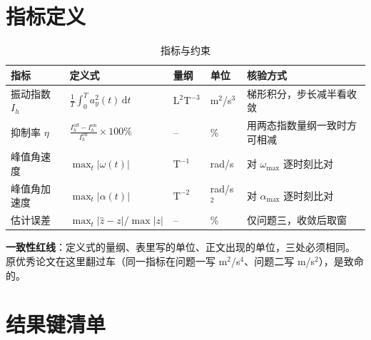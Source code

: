 \documentclass[a4paper,11pt]{ctexart}
\begin{document}
\section{指标定义}

\begin{table}[htbp]\centering\small
  \caption{指标与约束}
  \begin{tabular}{@{}L{0.14\textwidth}L{0.30\textwidth}L{0.12\textwidth}L{0.11\textwidth}L{0.24\textwidth}@{}}
    \toprule
    指标 & 定义式 & 量纲 & 单位 & 核验方式 \\
    \midrule
    振动指数 $I_h$ & $\displaystyle \frac{1}{T}\int_0^{T} a_y^2(t)\,\mathrm{d}t$
      & $\mathrm{L}^2\mathrm{T}^{-3}$ & m$^2$/s$^3$ & 梯形积分，步长减半看收敛 \\
    抑制率 $\eta$ & $\displaystyle \frac{I_h^{\text{off}}-I_h^{\text{on}}}{I_h^{\text{off}}}\times100\%$
      & -- & \% & 用两态指数量纲一致时方可相减 \\
    峰值角速度 & $\max_t |\omega(t)|$ & $\mathrm{T}^{-1}$ & rad/s & 对 $\omega_{\max}$ 逐时刻比对 \\
    峰值角加速度 & $\max_t |\alpha(t)|$ & $\mathrm{T}^{-2}$ & rad/s$^2$ & 对 $\alpha_{\max}$ 逐时刻比对 \\
    估计误差 & $\max_t |\hat z - z| / \max|z|$ & -- & \% & 仅问题三，收敛后取窗 \\
    \bottomrule
  \end{tabular}
\end{table}

\noindent\textbf{一致性红线}：定义式的量纲、表里写的单位、正文出现的单位，三处必须相同。
原优秀论文在这里翻过车（同一指标在问题一写 m$^2$/s$^4$、问题二写 m/s$^2$），是致命的。

\section{结果键清单}
\end{document}

